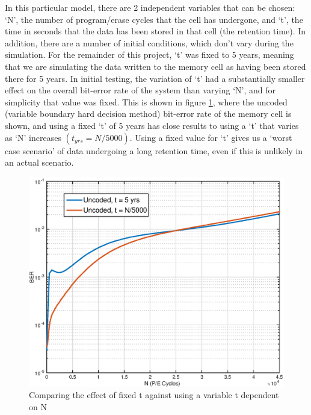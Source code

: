 \documentclass[11pt]{article}
\numberwithin{equation}{subsection}
\begin{document}
In this particular model, there are 2 independent variables that can be chosen: `N', the number of program/erase cycles that the cell has undergone, and `t', the time in seconds that the data has been stored in that cell (the retention time). In addition, there are a number of initial conditions, which don't vary during the simulation. For the remainder of this project, `t' was fixed to 5 years, meaning that we are simulating the data written to the memory cell as having been stored there for 5 years. In initial testing, the variation of `t' had a substantially smaller effect on the overall bit-error rate of the system than varying `N', and for simplicity that value was fixed. This is shown in figure \ref{fig:retention_time_graph}, where the uncoded (variable boundary hard decision method) bit-error rate of the memory cell is shown, and using a fixed `t' of 5 years has close results to using a `t' that varies as `N' increases $(t_{yrs} = N/5000)$. Using a fixed value for `t' gives us a `worst case scenario' of data undergoing a long retention time, even if this is unlikely in an actual scenario.
\begin{figure}[ht]
\centering
\includegraphics[scale=0.45]{retention_time_graph}
\caption{Comparing the effect of fixed t against using a variable t dependent on N}
\label{fig:retention_time_graph}
\end{figure}
\end{document}
